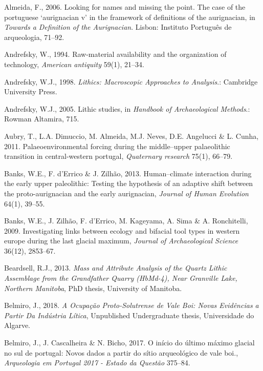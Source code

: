 \documentclass[12pt,twoside]{reedthesis}
\begin{document}
\leavevmode\hypertarget{ref-almeida2006}{}%
Almeida, F., 2006. Looking for names and missing the point. The case of the portuguese `aurignacian v' in the framework of definitions of the aurignacian, in \emph{Towards a Definition of the Aurignacian}. Lisbon: Instituto Português de arqueologia, 71--92.

\leavevmode\hypertarget{ref-andrefsky1994}{}%
Andrefsky, W., 1994. Raw-material availability and the organization of technology, \emph{American antiquity} 59(1), 21--34.

\leavevmode\hypertarget{ref-andrefsky1998}{}%
Andrefsky, W.J., 1998. \emph{Lithics: Macroscopic Approaches to Analysis}.: Cambridge University Press.

\leavevmode\hypertarget{ref-andrefsky2005}{}%
Andrefsky, W.J., 2005. Lithic studies, in \emph{Handbook of Archaeological Methods}.: Rowman Altamira, 715.

\leavevmode\hypertarget{ref-aubryetal2011}{}%
Aubry, T., L.A. Dimuccio, M. Almeida, M.J. Neves, D.E. Angelucci \& L. Cunha, 2011. Palaeoenvironmental forcing during the middle--upper palaeolithic transition in central-western portugal, \emph{Quaternary research} 75(1), 66--79.

\leavevmode\hypertarget{ref-banksetal2013}{}%
Banks, W.E., F. d'Errico \& J. Zilhão, 2013. Human--climate interaction during the early upper paleolithic: Testing the hypothesis of an adaptive shift between the proto-aurignacian and the early aurignacian, \emph{Journal of Human Evolution} 64(1), 39--55.

\leavevmode\hypertarget{ref-banksetal2009}{}%
Banks, W.E., J. Zilhão, F. d'Errico, M. Kageyama, A. Sima \& A. Ronchitelli, 2009. Investigating links between ecology and bifacial tool types in western europe during the last glacial maximum, \emph{Journal of Archaeological Science} 36(12), 2853--67.

\leavevmode\hypertarget{ref-beardsell2013}{}%
Beardsell, R.J., 2013. \emph{\textup{Mass and Attribute Analysis of the Quartz Lithic Assemblage from the Grandfather Quarry (HbMd-4), Near Granville Lake, Northern Manitoba}}, PhD thesis, University of Manitoba.

\leavevmode\hypertarget{ref-belmiro2018}{}%
Belmiro, J., 2018. \emph{\textup{A Ocupação Proto-Solutrense de Vale Boi: Novas Evidências a Partir Da Indústria Lítica}}, Unpublished Undergraduate thesis, Universidade do Algarve.

\leavevmode\hypertarget{ref-belmiro2017}{}%
Belmiro, J., J. Cascalheira \& N. Bicho, 2017. O início do último máximo glacial no sul de portugal: Novos dados a partir do sítio arqueológico de vale boi., \emph{Arqueologia em Portugal 2017 - Estado da Questão} 375--84.
\end{document}

